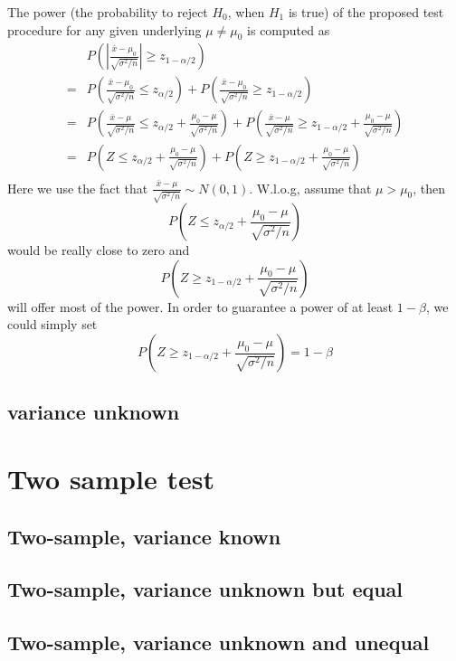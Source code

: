\documentclass[a4paper,12pt]{article}
\begin{document}
The power (the probability to reject $H_0$, when $H_1$ is true) of the proposed test procedure for any given underlying $\mu \neq \mu_0$ is computed as
\[
  \begin{aligned}
    & P\left(
      \left|
      \frac{\bar{x} - \mu_0}{\sqrt{\sigma^2 / n}}
      \right|
      \geq z_{1 - \alpha / 2}
      \right)    \\
    = & P\left(
        \frac{\bar{x} - \mu_0}{\sqrt{\sigma^2 / n}}
        \leq z_{\alpha / 2}
        \right)
        + P\left(
        \frac{\bar{x} - \mu_0}{\sqrt{\sigma^2 / n}}
        \geq z_{1 - \alpha / 2}
        \right)    \\
    = & P\left(
        \frac{\bar{x} - \mu}{\sqrt{\sigma^2 / n}}
        \leq z_{\alpha / 2}
        + \frac{\mu_0 - \mu}{\sqrt{\sigma^2 / n}}
        \right)
        + P\left(
        \frac{\bar{x} - \mu}{\sqrt{\sigma^2 / n}}
        \geq z_{1 - \alpha / 2}
        + \frac{\mu_0 - \mu}{\sqrt{\sigma^2 / n}}
        \right)    \\
    = & P\left(
        Z
        \leq z_{\alpha / 2}
        + \frac{\mu_0 - \mu}{\sqrt{\sigma^2 / n}}
        \right)
        + P\left(
        Z
        \geq z_{1 - \alpha / 2}
        + \frac{\mu_0 - \mu}{\sqrt{\sigma^2 / n}}
        \right)    \\
  \end{aligned}
\]
Here we use the fact that $  \frac{\bar{x} - \mu}{\sqrt{\sigma^2 / n}} \sim N\left(0, 1\right)$. W.l.o.g, assume that $\mu > \mu_0$, then
\[
  P\left(
    Z
    \leq z_{\alpha / 2}
    + \frac{\mu_0 - \mu}{\sqrt{\sigma^2 / n}}
  \right)
\]
would be really close to zero and
\[
  P\left(
    Z
    \geq z_{1 - \alpha / 2}
    + \frac{\mu_0 - \mu}{\sqrt{\sigma^2 / n}}
  \right) 
\]
will offer most of the power. In order to guarantee a power of at least $1 - \beta$, we could simply set
\[
    P\left(
    Z
    \geq z_{1 - \alpha / 2}
    + \frac{\mu_0 - \mu}{\sqrt{\sigma^2 / n}}
  \right)  = 1 - \beta
\]

\subsection{variance unknown}
\label{sec:variance-unknown}


\section{Two sample test}
\label{sec:two-sample-test}


\subsection{Two-sample, variance known}
\label{sec:two-sample-variance}

\subsection{Two-sample, variance unknown but equal}
\label{sec:two-sample-variance-1}

\subsection{Two-sample, variance unknown and unequal}
\label{sec:two-sample-variance-2}
\end{document}
